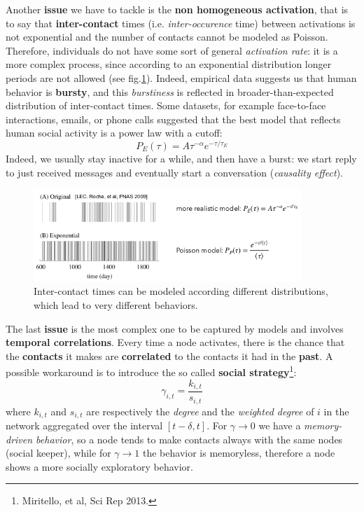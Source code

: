 \documentclass[../main/main.tex]{subfiles}
\begin{document}
Another \textbf{issue} we have to tackle is the \textbf{non homogeneous activation}, that is to say that \textbf{inter-contact} times (i.e. \textit{inter-occurence} time) between activations is not exponential and the number of contacts cannot be modeled as Poisson. Therefore, individuals do not have some sort of general \textit{activation rate}: it is a more complex process, since according to an exponential distribution longer periods are not allowed (see fig.\ref{fig:17_08}). Indeed, empirical data suggests us that human behavior is \textbf{bursty}, and this \textit{burstiness} is reflected in broader-than-expected distribution of inter-contact times. Some datasets, for example face-to-face interactions, emails, or phone calls suggested that the best model that reflects human social activity is a power law with a cutoff:
\begin{equation*}
    P_{E} ( \tau ) = A \tau ^{-\alpha} e^{-\tau/\tau_E}
\end{equation*}
Indeed, we usually stay inactive for a while, and then have a burst: we start reply to just received messages and eventually start a conversation (\textit{causality effect}).

\begin{figure}[h!]
\centering
\includegraphics[width=0.9\textwidth]{../lessons/image/17/image08.png}
\caption{\label{fig:17_08} Inter-contact times can be modeled according different distributions, which lead to very different behaviors. }
\end{figure}

The last \textbf{issue} is the most complex one to be captured by models and involves \textbf{temporal correlations}. Every time a node activates, there is the chance that the \textbf{contacts} it makes are \textbf{correlated} to the contacts it had in the \textbf{past}. A possible workaround is to introduce the so called \textbf{social strategy}\footnote{Miritello, et al, Sci Rep 2013.}:
\begin{equation}
    \gamma_{i,t} = \frac{k_{i,t}}{s_{i,t}}
\end{equation}
where $k_{i,t}$ and $s_{i,t}$ are respectively the \textit{degree} and the \textit{weighted degree} of $i$ in the network aggregated over the interval $[t-\delta, t]$. For $\gamma \to 0$ we have a \textit{memory-driven behavior}, so a node tends to make contacts always with the same nodes (social keeper), while for $\gamma \to 1$ the behavior is memoryless, therefore a node shows a more socially exploratory behavior.
\end{document}
